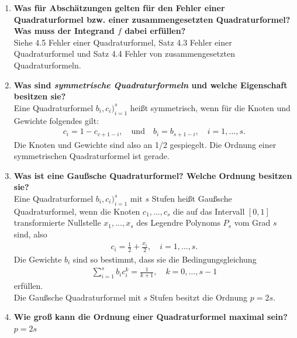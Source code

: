 \begin{enumerate}
		\item \textbf{Was für Abschätzungen gelten für den Fehler einer Quadraturformel bzw. einer zusammengesetzten Quadraturformel? Was muss der Integrand $f$ dabei erfüllen?} \\
			Siehe 4.5 Fehler einer Quadraturformel, Satz 4.3 Fehler einer Quadraturformel und Satz 4.4 Fehler von zusammengesetzten Quadraturformeln.
		
		\item \textbf{Was sind \textit{symmetrische Quadraturformeln} und welche Eigenschaft besitzen sie?} \\
			Eine Quadraturformel \(b_i,c_i)^s_{i=1}\) heißt symmetrisch, wenn für die Knoten und Gewichte folgendes gilt:
			\begin{align*}
				c_i=1-c_{c+1-i}, \quad \text{und} \quad b_i=b_{s+1-i}, \quad i=1,\dots,s.
			\end{align*}
			Die Knoten und Gewichte sind also an 1/2 gespiegelt. Die Ordnung einer symmetrischen Quadraturformel ist gerade.
		
		\item \textbf{Was ist eine Gaußsche Quadraturformel? Welche Ordnung besitzen sie?} \\
			Eine Quadraturformel \(b_i,c_i)^s_{i=1}\) mit \(s\) Stufen heißt Gaußsche Quadraturformel, wenn die Knoten \(c_1,\dots,c_s\) die auf das Intervall \([0,1]\) transformierte Nullstelle \(x_1,\dots,x_s\) des Legendre Polynoms \(P_s\) vom Grad \(s\) sind, also
			\begin{align*}
				c_i=\frac{1}{2}+\frac{x_i}{2}, \quad i=1,\dots,s.
			\end{align*}
			Die Gewichte \(b_i\) sind so bestimmt, dass sie die Bedingungsgleichung
			\begin{align*}
				\sum_{i=1}^{s}b_ic_i^k=\frac{1}{k+1}, \quad k=0,\dots,s-1
			\end{align*}
			erfüllen. \\
			Die Gaußsche Quadraturformel mit \(s\) Stufen besitzt die Ordnung \(p=2s\).
			
		\item \textbf{Wie groß kann die Ordnung einer Quadraturformel maximal sein?} \\
			\(p=2s\)
		

\end{enumerate}
